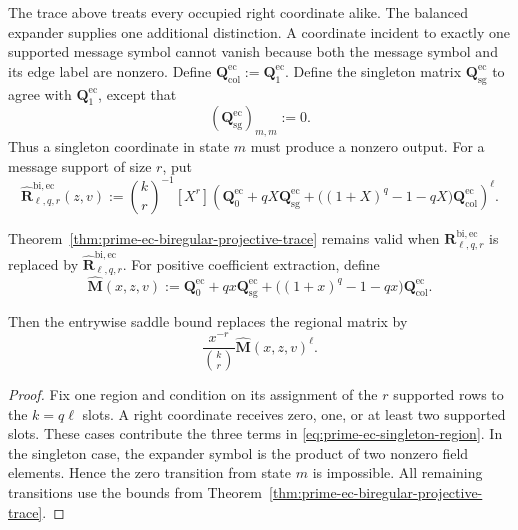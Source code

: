 The trace above treats every occupied right coordinate alike.  The balanced
expander supplies one additional distinction.  A coordinate incident to
exactly one supported message symbol cannot vanish because both the message
symbol and its edge label are nonzero.  Define
\(\mathbf Q^{\mathrm{ec}}_{\mathrm{col}}:=
\mathbf Q^{\mathrm{ec}}_1\).  Define the singleton matrix
\(\mathbf Q^{\mathrm{ec}}_{\mathrm{sg}}\) to agree with
\(\mathbf Q^{\mathrm{ec}}_1\), except that
\begin{equation}
 (\mathbf Q^{\mathrm{ec}}_{\mathrm{sg}})_{m,m}:=0.
 \label{eq:prime-ec-singleton-matrix}
\end{equation}
Thus a singleton coordinate in state $m$ must produce a nonzero output.
For a message support of size $r$, put
\begin{equation}
 \widehat{\mathbf R}^{\mathrm{bi,ec}}_{\ell,q,r}(z,v)
 :=\binom{k}{r}^{-1}[X^r]
 \left(
  \mathbf Q^{\mathrm{ec}}_0
  +qX\mathbf Q^{\mathrm{ec}}_{\mathrm{sg}}
  +\bigl((1+X)^q-1-qX\bigr)
     \mathbf Q^{\mathrm{ec}}_{\mathrm{col}}
 \right)^\ell.
 \label{eq:prime-ec-singleton-region}
\end{equation}

\begin{corollary}
\label{cor:prime-ec-singleton-trace}
Theorem~\ref{thm:prime-ec-biregular-projective-trace} remains valid when
\(\mathbf R^{\mathrm{bi,ec}}_{\ell,q,r}\) is replaced by
\(\widehat{\mathbf R}^{\mathrm{bi,ec}}_{\ell,q,r}\).
For positive coefficient extraction, define
\begin{equation}
 \widehat{\mathbf M}(x,z,v)
 :=\mathbf Q^{\mathrm{ec}}_0
   +qx\mathbf Q^{\mathrm{ec}}_{\mathrm{sg}}
   +\bigl((1+x)^q-1-qx\bigr)
      \mathbf Q^{\mathrm{ec}}_{\mathrm{col}}.
 \label{eq:prime-ec-singleton-saddle-matrix}
\end{equation}
\par\noindent
Then the entrywise saddle bound replaces the regional matrix by
\begin{equation*}
 \frac{x^{-r}}{\binom{k}{r}}\widehat{\mathbf M}(x,z,v)^\ell.
\end{equation*}
\end{corollary}

\begin{proof}
Fix one region and condition on its assignment of the $r$ supported rows to
the $k=q\ell$ slots.  A right coordinate receives zero, one, or at least two
supported slots.  These cases contribute the three terms in
\eqref{eq:prime-ec-singleton-region}.  In the singleton case, the expander
symbol is the product of two nonzero field elements.  Hence the zero
transition from state $m$ is impossible.  All remaining transitions use the
bounds from Theorem~\ref{thm:prime-ec-biregular-projective-trace}.
\end{proof}

